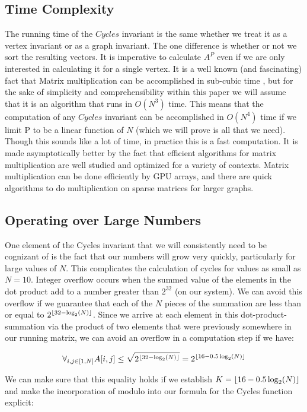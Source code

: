 \subsection{Time Complexity}
The running time of the $Cycles$ invariant is the same whether we treat it as a vertex invariant or as a graph invariant.
The one difference is whether or not we sort the resulting vectors.
It is imperative to calculate $A^P$ even if we are only interested in calculating it for a single vertex.
It is a well known (and fascinating) fact that Matrix multiplication can be accomplished in sub-cubic time \cite{subcubicrunningmatrixmult}, but for the sake of simplicity and comprehensibility within this paper we will assume that it is an algorithm that runs in $O(N^3)$  time.
This means that the computation of any $Cycles$ invariant can be accomplished in $O(N^4)$ time if we limit P to be a linear function of $N$ (which we will prove is all that we need).
Though this sounds like a lot of time, in practice this is a fast computation.
It is made asymptotically better by the fact that efficient algorithms for matrix multiplication are well studied and optimized for a variety of contexts.
Matrix multiplication can be done efficiently by GPU arrays, and there are quick algorithms to do multiplication on sparse matrices for larger graphs.


\subsection{Operating over Large Numbers}
One element of the Cycles invariant that we will consistently need to be cognizant of is the fact that our numbers will grow very quickly, particularly for large values of $N$.
This complicates the calculation of cycles for values as small as $N=10$.
Integer overflow occurs when the summed value of the elements in the dot product add to a number greater than $2^{32}$ (on our system).
We can avoid this overflow if we guarantee that each of the $N$ pieces of the summation are less than or equal to $2^{\lfloor32 - \log_2(N)\rfloor}$.
Since we arrive at each element in this dot-product-summation via the product of two elements that were previously somewhere in our running matrix, we can avoid an overflow in a computation step if we have:

$$ \forall_{i, j \in [1, N]} A[i, j] \leq \sqrt{2^{\lfloor32 - \log_2(N)\rfloor}} = 2^{\lfloor16 - 0.5\log_2(N)\rfloor}$$

We can make sure that this equality holds if we establish $K = \lfloor16 - 0.5\log_2(N)\rfloor$ and make the incorporation of modulo into our formula for the Cycles function explicit:

